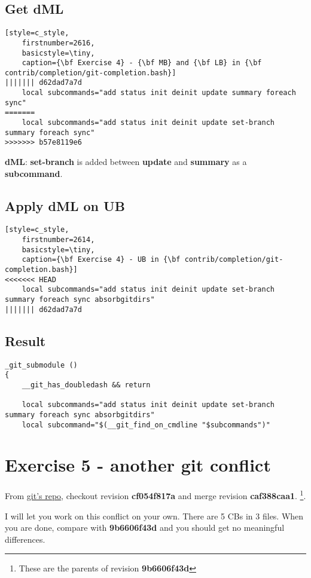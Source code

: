 \subsection*{Get {\bf dML}}
\begin{lstlisting}[style=c_style,
	firstnumber=2616,
	basicstyle=\tiny,
	caption={\bf Exercise 4} - {\bf MB} and {\bf LB} in {\bf contrib/completion/git-completion.bash}]
||||||| d62dad7a7d
	local subcommands="add status init deinit update summary foreach sync"
=======
	local subcommands="add status init deinit update set-branch summary foreach sync"
>>>>>>> b57e8119e6
\end{lstlisting}

{\bf dML}: {\bf set-branch} is added between {\bf update} and {\bf summary} as a {\bf subcommand}.

\subsection*{Apply {\bf dML} on {\bf UB}}
\begin{lstlisting}[style=c_style,
	firstnumber=2614,
	basicstyle=\tiny,
	caption={\bf Exercise 4} - UB in {\bf contrib/completion/git-completion.bash}]
<<<<<<< HEAD
	local subcommands="add status init deinit update set-branch summary foreach sync absorbgitdirs"
||||||| d62dad7a7d
\end{lstlisting}

\subsection*{Result}
\begin{lstlisting}[style=c_style,
	firstnumber=2610,
	basicstyle=\tiny,
	caption={\bf Exercise 4} - Conflict Resolution]
_git_submodule ()
{
	__git_has_doubledash && return

	local subcommands="add status init deinit update set-branch summary foreach sync absorbgitdirs"
	local subcommand="$(__git_find_on_cmdline "$subcommands")"
\end{lstlisting}


\section{Exercise 5 - another git conflict}
\label{exercise_05}
From \hyperref[git_repo]{git's repo}, checkout revision {\bf cf054f817a} and merge revision {\bf caf388caa1}.
\footnote{These are the parents of revision {\bf 9b6606f43d}}.

I will let you work on this conflict on your own. There are 5 CBs in 3 files. When you are done, compare
with {\bf 9b6606f43d} and you should get no meaningful differences.

